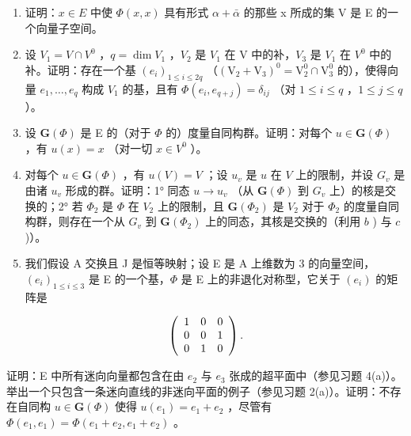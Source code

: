 \begin{enumerate}
\def\labelenumi{\alph{enumi})}
\item
  证明：\(x \in E\) 中使 \(\Phi(x, x)\) 具有形式 \(\alpha + \bar{\alpha}\) 的那些 x 所成的集 V 是 E 的一个向量子空间。
\item
  设 \(V_{1}=V\cap V^{0}\) ，\(q=\dim V_{1}\) ，\(V_{2}\) 是 \(V_{1}\) 在 V 中的补，\(V_{3}\) 是 \(V_{1}\) 在 \(V^{0}\) 中的补。证明：存在一个基 \((e_{i})_{1\leqslant i\leqslant2q}\) （\((\mathrm{V}_{2}+\mathrm{V}_{3})^{0}=\mathrm{V}_{2}^{0}\cap\mathrm{V}_{3}^{0}\) 的），使得向量 \(e_1, \ldots, e_q\) 构成 \(V_1\) 的基，且有 \(\Phi(e_i, e_{q+j}) = \delta_{ij}\) （对 \(1 \leqslant i \leqslant q\) ，\(1 \leqslant j \leqslant q\) ）。
\item
  设 \(\mathbf{G}(\Phi)\) 是 E 的（对于 \(\Phi\) 的）度量自同构群。证明：对每个 \(u \in \mathbf{G}(\Phi)\) ，有 \(u(x) = x\) （对一切 \(x \in V^0\) ）。
\item
  对每个 \(u \in \mathbf{G}(\Phi)\) ，有 \(u(V) = V\) ；设 \(u_{v}\) 是 \(u\) 在 \(V\) 上的限制，并设 \(G_{v}\) 是由诸 \(u_{v}\) 形成的群。证明：1° 同态 \(u \to u_{v}\) （从 \(\mathbf{G}(\Phi)\) 到 \(G_{v}\) 上）的核是交换的；2° 若 \(\Phi_{2}\) 是 \(\Phi\) 在 \(V_{2}\) 上的限制，且 \(\mathbf{G}(\Phi_{2})\) 是 \(V_{2}\) 对于 \(\Phi_{2}\) 的度量自同构群，则存在一个从 \(G_{v}\) 到 \(\mathbf{G}(\Phi_{2})\) 上的同态，其核是交换的（利用 \(b\) ) 与 \(c\) )）。
\item
  我们假设 A 交换且 J 是恒等映射；设 E 是 A 上维数为 3 的向量空间，\((e_{i})_{1\leqslant i\leqslant3}\) 是 E 的一个基，\(\Phi\) 是 E 上的非退化对称型，它关于 \((e_{i})\) 的矩阵是
\end{enumerate}

\[
\left( \begin{array}{c c c} 1 & 0 & 0 \\ 0 & 0 & 1 \\ 0 & 1 & 0 \end{array} \right).
\]

证明：E 中所有迷向向量都包含在由 \(e_{2}\) 与 \(e_{3}\) 张成的超平面中（参见习题 4(a)）。举出一个只包含一条迷向直线的非迷向平面的例子（参见习题 2(a)）。证明：不存在自同构 \(u \in \mathbf{G}(\Phi)\) 使得 \(u(e_{1}) = e_{1} + e_{2}\) ，尽管有 \(\Phi(e_{1}, e_{1}) = \Phi(e_{1} + e_{2}, e_{1} + e_{2})\) 。

